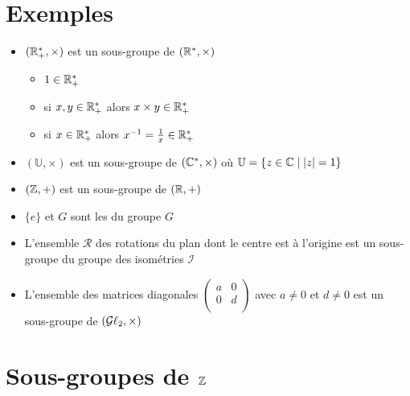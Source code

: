 \section{Exemples}

\begin{frame}
\begin{itemize}
  \item $(\mathbb{R}^*_+,\times)$ est un sous-groupe de $(\mathbb{R}^*,\times)$
\pause
  \begin{itemize}
     \item $1 \in \mathbb{R}^*_+$ \pause
     \item si $x,y \in \mathbb{R}^*_+$ alors $x\times y \in \mathbb{R}^*_+$ \pause
     \item si $x \in \mathbb{R}^*_+$ alors $x^{-1} = \frac 1 x \in \mathbb{R}^*_+$
   \end{itemize}
\pause
  \item $(\mathbb{U},\times)$ est un sous-groupe de $(\mathbb{C}^*,\times)$ où 
$\mathbb{U} = \{ z \in \mathbb{C} \mid |z|=1 \}$
\pause
  \item $(\mathbb{Z},+)$ est un sous-groupe de $(\mathbb{R},+)$
\pause
  \item $\{e\}$ et $G$ sont les  du groupe $G$
\pause
  \item L'ensemble $\mathcal{R}$ des rotations du plan dont le centre est à l'origine 
est un sous-groupe du groupe des isométries $\mathcal{I}$
\pause
  \item L'ensemble des matrices diagonales $\left(\begin{smallmatrix} a & 0 \\ 0 & d \\ \end{smallmatrix}\right)$
avec $a\neq 0$ et $d\neq 0$ est un sous-groupe de $(\mathcal{G}\ell_2,\times)$

\end{itemize}  
\end{frame}




\section{Sous-groupes de $\mathbb{Z}$}

